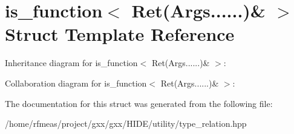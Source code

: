 \hypertarget{structis__function_3_01Ret_07Args_8_8_8_8_8_8_08_6_01_4}{}\section{is\+\_\+function$<$ Ret(Args......)\& $>$ Struct Template Reference}
\label{structis__function_3_01Ret_07Args_8_8_8_8_8_8_08_6_01_4}


Inheritance diagram for is\+\_\+function$<$ Ret(Args......)\& $>$\+:


Collaboration diagram for is\+\_\+function$<$ Ret(Args......)\& $>$\+:


The documentation for this struct was generated from the following file\+:\begin{DoxyCompactItemize}
\item 
/home/rfmeas/project/gxx/gxx/\+H\+I\+D\+E/utility/type\+\_\+relation.\+hpp\end{DoxyCompactItemize}
